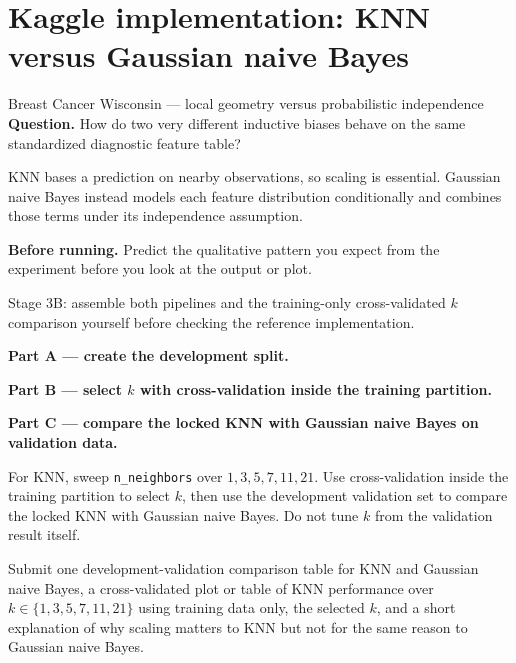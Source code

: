 \section{Kaggle implementation: KNN versus Gaussian naive Bayes}
\label{sec:kaggle-breast-knn-nb}

\begin{kaggleproject}{Breast Cancer Wisconsin --- local geometry versus probabilistic independence}
\textbf{Question.} How do two very different inductive biases behave on the same standardized diagnostic feature table?
\end{kaggleproject}

KNN bases a prediction on nearby observations, so scaling is essential. Gaussian naive Bayes instead models each feature distribution conditionally and combines those terms under its independence assumption.

\textbf{Before running.} Predict the qualitative pattern you expect from the experiment before you look at the output or plot.

\begin{labmode}
Stage 3B: assemble both pipelines and the training-only cross-validated $k$ comparison yourself before checking the reference implementation.
\end{labmode}

\textbf{Part A --- create the development split.}



\textbf{Part B --- select \(k\) with cross-validation inside the training partition.}



\textbf{Part C --- compare the locked KNN with Gaussian naive Bayes on validation data.}




\begin{tryit}
For KNN, sweep \texttt{n\_neighbors} over $1,3,5,7,11,21$. Use cross-validation inside the training partition to select $k$, then use the development validation set to compare the locked KNN with Gaussian naive Bayes. Do not tune $k$ from the validation result itself.
\end{tryit}

\begin{labdeliverable}
Submit one development-validation comparison table for KNN and Gaussian naive Bayes, a cross-validated plot or table of KNN performance over $k\in\{1,3,5,7,11,21\}$ using training data only, the selected $k$, and a short explanation of why scaling matters to KNN but not for the same reason to Gaussian naive Bayes.
\end{labdeliverable}
